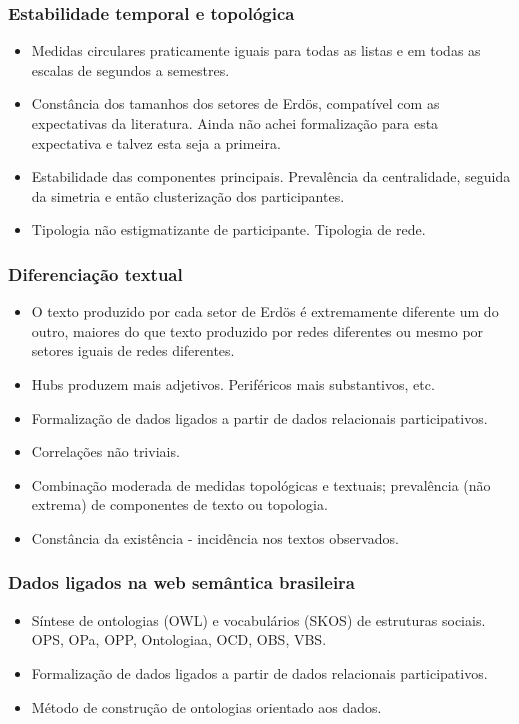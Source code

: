 \documentclass[10pt]{beamer}
\begin{document}
\begin{frame}
\frametitle{Estabilidade temporal e topológica}
\begin{itemize}
	\item Medidas circulares praticamente iguais para todas as listas e em todas as escalas de segundos a semestres.
	\item Constância dos tamanhos dos setores de Erdös, compatível com as expectativas da literatura. Ainda não achei formalização para esta expectativa e talvez esta seja a primeira.
	\item Estabilidade das componentes principais. Prevalência da centralidade, seguida da simetria e então clusterização dos participantes.
	\item Tipologia não estigmatizante de participante. Tipologia de rede.
\end{itemize}
\end{frame}

\begin{frame}
\frametitle{Diferenciação textual}
\begin{itemize}
	\item O texto produzido por cada setor de Erdös é extremamente diferente um do outro, maiores do que texto produzido por redes diferentes ou mesmo por setores iguais de redes diferentes.
	\item Hubs produzem mais adjetivos. Periféricos mais substantivos, etc.
	\item Formalização de dados ligados a partir de dados relacionais participativos.
	\item Correlações não triviais.
	\item Combinação moderada de medidas topológicas e textuais; prevalência (não extrema) de componentes de texto ou topologia.
	\item Constância da existência - incidência nos textos observados.
\end{itemize}
\end{frame}

\begin{frame}
\frametitle{Dados ligados na web semântica brasileira}
\begin{itemize}
	\item Síntese de ontologias (OWL) e vocabulários (SKOS) de estruturas sociais. OPS, OPa, OPP, Ontologiaa, OCD, OBS, VBS.
	\item Formalização de dados ligados a partir de dados relacionais participativos.
	\item Método de construção de ontologias orientado aos dados.
\end{itemize}
\end{frame}
\end{document}
